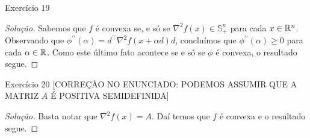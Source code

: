 \documentclass[12pt,twoside,a4paper]{article}
\begin{document}
\begin{problema}\label{phiconv}
 Exercício 19
\end{problema}
\begin{proof}[Solução]
  Sabemos que \(f\) é convexa se, e só se
  \(\nabla^2f(x)\in\mathbb{S}^n_+\) para cada \(x\in\mathbb{R}^n\). Observando
  que \(\phi^{\prime\prime}(\alpha)=d^\top\nabla^2f(x+\alpha d) d\),
  concluímos que \(\phi^{\prime\prime}(\alpha)\geq 0\) para cada
  \(\alpha\in\mathbb{R}\). Como este último fato acontece se e só se \(\phi\)
  é convexa, o resultado segue.
\end{proof}

\begin{problema}
Exercício 20 [CORREÇÃO NO ENUNCIADO: PODEMOS ASSUMIR QUE A MATRIZ \(A\) É
POSITIVA SEMIDEFINIDA]  
\end{problema}
\begin{proof}[Solução]
  Basta notar que \(\nabla^2 f(x)=A\). Daí temos que \(f\) é convexa e o
  resultado segue.
\end{proof}
\end{document}
